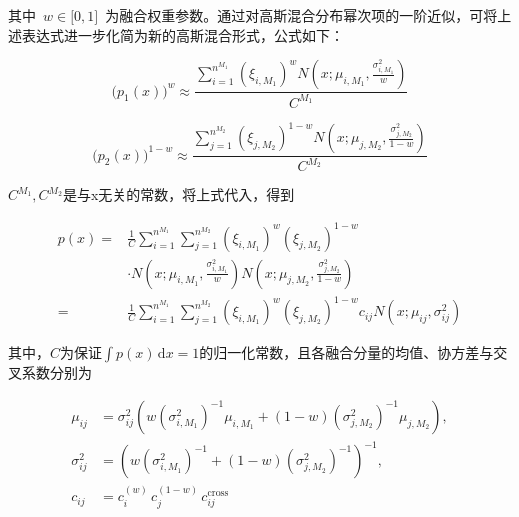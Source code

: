 \documentclass[UTF8,a4paper,zihao=-4]{ctexart}
\begin{document}
其中~\(w \in \lbrack 0,1\rbrack\)~为融合权重参数。通过对高斯混合分布幂次项的一阶近似，可将上述表达式进一步化简为新的高斯混合形式，公式如下：


\begin{equation}
\bigl(p_1(x)\bigr)^w\approx\frac{\displaystyle\sum_{i=1}^{n^{M_1}}(\xi_{i,M_1})^w N\!\left(x;\mu_{i,M_1},\frac{\sigma_{i,M_1}^{2}}{w}\right)}{C^{M_1}}
\label{eq:word-76}
\end{equation}



\begin{equation}
\bigl(p_2(x)\bigr)^{1-w}\approx\frac{\displaystyle\sum_{j=1}^{n^{M_2}}(\xi_{j,M_2})^{1-w}N\!\left(x;\mu_{j,M_2},\frac{\sigma_{j,M_2}^{2}}{1-w}\right)}{C^{M_2}}
\label{eq:word-77}
\end{equation}


\(C^{M_1},C^{M_2}\)是与x无关的常数，将上式代入，得到


\begin{equation}
\begin{aligned}
p(x)={}&\frac1C\sum_{i=1}^{n^{M_1}}\sum_{j=1}^{n^{M_2}}(\xi_{i,M_1})^w(\xi_{j,M_2})^{1-w}\\
&\cdot N\!\left(x;\mu_{i,M_1},\frac{\sigma_{i,M_1}^{2}}{w}\right)N\!\left(x;\mu_{j,M_2},\frac{\sigma_{j,M_2}^{2}}{1-w}\right)\\
={}&\frac1C\sum_{i=1}^{n^{M_1}}\sum_{j=1}^{n^{M_2}}(\xi_{i,M_1})^w(\xi_{j,M_2})^{1-w}c_{ij}N(x;\mu_{ij},\sigma_{ij}^{2})
\end{aligned}
\label{eq:word-78}
\end{equation}


其中，\(C\)为保证\(\int p(x)\,\mathrm dx=1\)的归一化常数，且各融合分量的均值、协方差与交叉系数分别为


\begin{equation}
\begin{aligned}
\mu_{ij}&=\sigma_{ij}^{2}\left(w(\sigma_{i,M_1}^{2})^{-1}\mu_{i,M_1}+(1-w)(\sigma_{j,M_2}^{2})^{-1}\mu_{j,M_2}\right),\\
\sigma_{ij}^{2}&=\left(w(\sigma_{i,M_1}^{2})^{-1}+(1-w)(\sigma_{j,M_2}^{2})^{-1}\right)^{-1},\\
c_{ij}&=c_{i}^{(w)}\,c_{j}^{(1-w)}\,c_{ij}^{\mathrm{cross}}
\end{aligned}
\label{eq:word-80}
\end{equation}
\end{document}
